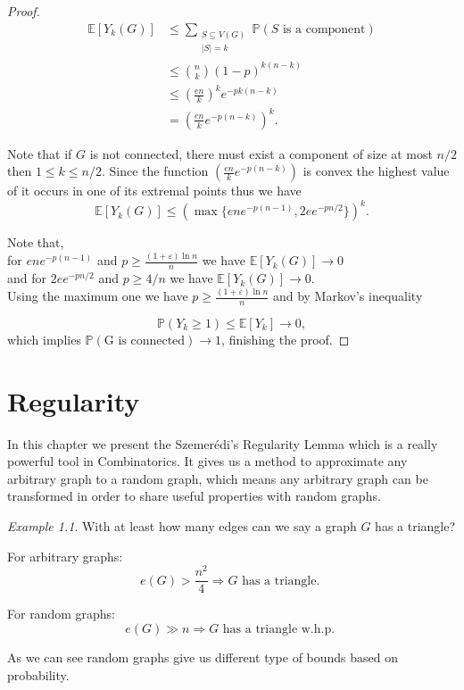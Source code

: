 \documentclass[12pt,twoside,a4paper,bibliography=totocnumbered]{book}
\numberwithin{equation}{section}
\let\log=\ln
\theoremstyle{remark}
\newtheorem{example}	[theorem] {Example}
\begin{document}
\begin{proof}
\begin{align*}
\mathbb{E}[Y_k (G)]  & \leq \sum_{\substack{S\subseteq V(G) \\ |S| = k}} \mathbb{P}(S\text{ is a component})\\
&\leq \binom{n}{k}(1-p)^{k(n-k)}\\
&\leq \left( \frac{en}{k} \right) ^k e^{-pk(n-k)}\\
& = \left( \frac{en}{k} e^{-p(n-k)} \right)^k.
\end{align*}

Note that if $G$ is not connected, there must exist a component of size at most $ n/2$ then $1 \leq k \leq n/2$. Since the function $\left( \frac{en}{k} e^{-p(n-k)} \right)$ is convex the highest value of it occurs in one of its extremal points thus we have
$$\mathbb{E}[Y_k (G)] \leq (\max\{ene^{-p(n-1)}, 2ee^{-pn/2}\})^k .$$

Note that, \\
for $ene^{-p(n-1)}$ and $p \geq \frac{(1 + \varepsilon) \log n}{n}$ we have $\mathbb{E}[Y_k (G)] \rightarrow 0$\\
and for $2ee^{-pn/2}$ and $p \geq 4/n$ we have $\mathbb{E}[Y_k (G)] \rightarrow 0$.\\

Using the maximum one we have $p \geq \frac{(1 + \varepsilon) \log n}{n}$  and by Markov's inequality

 $$\mathbb{P}(Y_k \geq 1) \leq \mathbb{E}[Y_k] \rightarrow 0,$$
 which implies $\mathbb{P}(\text{G is connected}) \rightarrow 1$, finishing the proof.

\end{proof}
\chapter{Regularity}
In this chapter we present the Szemerédi's Regularity Lemma which is a really powerful tool in Combinatorics. It gives us a method to approximate any arbitrary graph to a random graph, which means any arbitrary graph can be transformed in order to share useful properties with random graphs.

\begin{example}
With at least how many edges can we say a graph $G$ has a triangle?

For arbitrary graphs:
$$ e(G) > \frac{n^2}{4} \Rightarrow G \text{ has a triangle. }$$

For random graphs:
$$ e(G) \gg n \Rightarrow G\text{ has a triangle w.h.p. } $$

As we can see random graphs give us different type of bounds based on probability.

\end{example}
\end{document}
